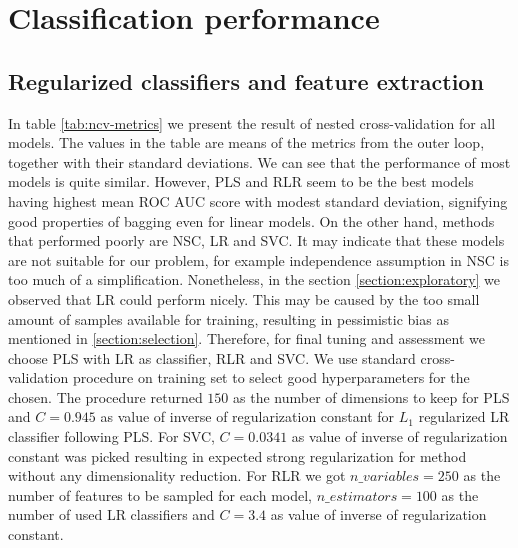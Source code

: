 \documentclass[shortabstract, english, mgr]{iithesis}
\begin{document}
\section{Classification performance} 

\subsection{Regularized classifiers and feature extraction} \label{section:performance}

In table \ref{tab:ncv-metrics} we present the result of nested cross-validation for all models. The values in the table are means of the metrics from the outer loop, together with their standard deviations. We can see that the performance of most models is quite similar. However, PLS and RLR seem to be the best models having highest mean ROC AUC score with modest standard deviation, signifying good properties of bagging even for linear models. On the other hand, methods that performed poorly are NSC, LR and SVC. It may indicate that these models are not suitable for our problem, for example independence assumption in NSC is too much of a simplification. Nonetheless, in the section \ref{section:exploratory} we observed that LR could perform nicely. This may be caused by the too small amount of samples available for training, resulting in pessimistic bias as mentioned in \ref{section:selection}. Therefore, for final tuning and assessment we choose PLS with LR as classifier, RLR and SVC. We use standard cross-validation procedure on training set to select good hyperparameters for the chosen. The procedure returned $150$ as the number of dimensions to keep for PLS and $C=0.945$ as value of inverse of regularization constant for $L_1$ regularized LR classifier following PLS. For SVC, $C=0.0341$ as value of inverse of regularization constant was picked resulting in expected strong regularization for method without any dimensionality reduction. For RLR we got $n\_variables=250$ as the number of features to be sampled for each model, $n\_estimators=100$ as the number of used LR classifiers and $C=3.4$ as value of inverse of regularization constant.
\end{document}
